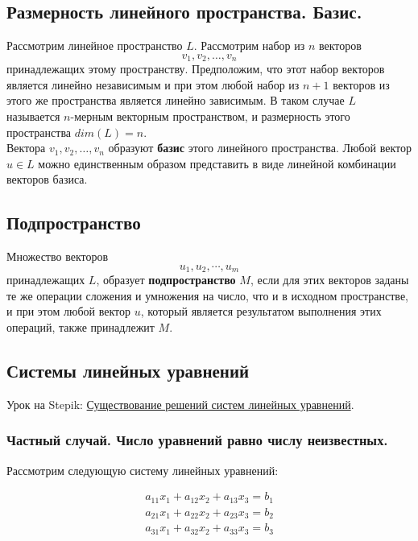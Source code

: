 \documentclass{article}
\begin{document}
\subsection{Размерность линейного пространства. Базис.}

Рассмотрим линейное пространство $L$. Рассмотрим набор из $n$ векторов $$v_1, v_2, \dots, v_n$$ принадлежащих этому пространству. Предположим, что этот набор векторов является линейно независимым и при этом любой набор из $n + 1$ векторов из этого же пространства является линейно зависимым. В таком случае $L$ называется $n$-мерным векторным пространством, и размерность этого пространства $dim(L) = n$. \\

Вектора $v_1, v_2, \dots, v_n$ образуют \textbf{базис} этого линейного пространства. Любой вектор $u \in L$ можно единственным образом представить в виде линейной комбинации векторов базиса. \\

\subsection{Подпространство}

Множество векторов $$u_1, u_2, \cdots, u_m$$ принадлежащих $L$, образует \textbf{подпространство} $M$, если для этих векторов заданы те же операции сложения и умножения на число, что и в исходном пространстве, и при этом любой вектор $u$, который является результатом выполнения этих операций, также принадлежит $M$.

\subsection{Системы линейных уравнений}

Урок на Stepik: \href{https://stepik.org/course/2461/syllabus}{Существование решений систем линейных уравнений}. \\

\subsubsection{Частный случай. Число уравнений равно числу неизвестных.}

Рассмотрим следующую систему линейных уравнений:

\[ \begin{array}{c}
	a_{11} x_{1} + a_{12} x_2 + a_{13} x_3 = b_1 \\
	a_{21} x_{1} + a_{22} x_2 + a_{23} x_3 = b_2 \\
	a_{31} x_{1} + a_{32} x_2 + a_{33} x_3 = b_3 \\
\end{array} \]
\end{document}
